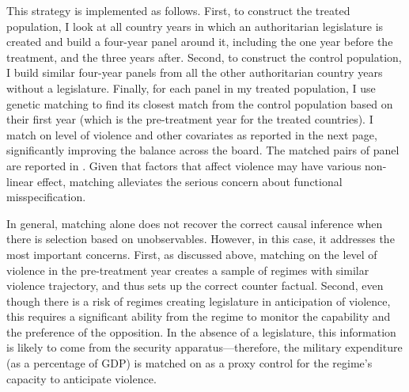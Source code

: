 This strategy is implemented as follows. First, to construct the treated population, I look at all country years in which an authoritarian legislature is created and build a four-year panel around it, including the one year before the treatment, and the three years after. Second, to construct the control population, I build similar four-year panels from all the other authoritarian country years without a legislature. Finally, for each panel in my treated population, I use genetic matching to find its closest match from the control population based on their first year (which is the pre-treatment year for the treated countries). I match on level of violence and other covariates as reported in the next page, significantly improving the balance across the board. The matched pairs of panel are reported in . Given that factors that affect violence may have various non-linear effect, matching alleviates the serious concern about functional misspecification. 

In general, matching alone does not recover the correct causal inference when there is selection based on unobservables. However, in this case, it addresses the most important concerns. First, as discussed above, matching on the level of violence in the pre-treatment year creates a sample of regimes with similar violence trajectory, and thus sets up the correct counter factual. Second, even though there is a risk of regimes creating legislature in anticipation of violence, this requires a significant ability from the regime to monitor the capability and the preference of the opposition. In the absence of a legislature, this information is likely to come from the security apparatus---therefore, the military expenditure (as a percentage of GDP) is matched on as a proxy control for the regime's capacity to anticipate violence.

